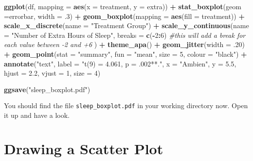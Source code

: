 \documentclass[
]{book}
\newenvironment{Shaded}{\begin{snugshade}}{\end{snugshade}}
\newcommand{\AttributeTok}[1]{\textcolor[rgb]{0.13,0.29,0.53}{#1}}
\newcommand{\CommentTok}[1]{\textcolor[rgb]{0.56,0.35,0.01}{\textit{#1}}}
\newcommand{\DecValTok}[1]{\textcolor[rgb]{0.00,0.00,0.81}{#1}}
\newcommand{\FloatTok}[1]{\textcolor[rgb]{0.00,0.00,0.81}{#1}}
\newcommand{\FunctionTok}[1]{\textcolor[rgb]{0.13,0.29,0.53}{\textbf{#1}}}
\newcommand{\NormalTok}[1]{#1}
\newcommand{\SpecialCharTok}[1]{\textcolor[rgb]{0.81,0.36,0.00}{\textbf{#1}}}
\newcommand{\StringTok}[1]{\textcolor[rgb]{0.31,0.60,0.02}{#1}}
\begin{document}
\begin{Shaded}
\begin{Highlighting}[]
\FunctionTok{ggplot}\NormalTok{(df, }\AttributeTok{mapping =} \FunctionTok{aes}\NormalTok{(}\AttributeTok{x =}\NormalTok{ treatment, }\AttributeTok{y =}\NormalTok{ extra)) }\SpecialCharTok{+} 
  \FunctionTok{stat\_boxplot}\NormalTok{(}\AttributeTok{geom =}\StringTok{\textquotesingle{}errorbar\textquotesingle{}}\NormalTok{, }\AttributeTok{width =}\NormalTok{ .}\DecValTok{3}\NormalTok{) }\SpecialCharTok{+}
  \FunctionTok{geom\_boxplot}\NormalTok{(}\AttributeTok{mapping =} \FunctionTok{aes}\NormalTok{(}\AttributeTok{fill =}\NormalTok{ treatment)) }\SpecialCharTok{+} 
  \FunctionTok{scale\_x\_discrete}\NormalTok{(}\AttributeTok{name =} \StringTok{"Treatment Group"}\NormalTok{) }\SpecialCharTok{+} 
  \FunctionTok{scale\_y\_continuous}\NormalTok{(}\AttributeTok{name =} \StringTok{"Number of Extra Hours of Sleep"}\NormalTok{, }
                     \AttributeTok{breaks =} \FunctionTok{c}\NormalTok{(}\SpecialCharTok{{-}}\DecValTok{2}\SpecialCharTok{:}\DecValTok{6}\NormalTok{) }\CommentTok{\#this will add a break for each value between {-}2 and +6}
\NormalTok{                     ) }\SpecialCharTok{+}
  \FunctionTok{theme\_apa}\NormalTok{() }\SpecialCharTok{+}
  \FunctionTok{geom\_jitter}\NormalTok{(}\AttributeTok{width =}\NormalTok{ .}\DecValTok{20}\NormalTok{) }\SpecialCharTok{+}
  \FunctionTok{geom\_point}\NormalTok{(}\AttributeTok{stat =} \StringTok{"summary"}\NormalTok{, }\AttributeTok{fun =} \StringTok{"mean"}\NormalTok{, }\AttributeTok{size =} \DecValTok{5}\NormalTok{, }\AttributeTok{colour =} \StringTok{"black"}\NormalTok{) }\SpecialCharTok{+} 
  \FunctionTok{annotate}\NormalTok{(}\StringTok{"text"}\NormalTok{,}
           \AttributeTok{label =} \StringTok{"t(9) = 4.061, p = .002**."}\NormalTok{,}
           \AttributeTok{x =} \StringTok{"Ambien"}\NormalTok{, }
           \AttributeTok{y =} \FloatTok{5.5}\NormalTok{, }
           \AttributeTok{hjust =} \FloatTok{2.2}\NormalTok{, }
           \AttributeTok{vjust =} \DecValTok{1}\NormalTok{, }
           \AttributeTok{size =} \DecValTok{4}\NormalTok{)}


\FunctionTok{ggsave}\NormalTok{(}\StringTok{"sleep\_boxplot.pdf"}\NormalTok{)}
\end{Highlighting}
\end{Shaded}

You should find the file \texttt{sleep\_boxplot.pdf} in your working directory now. Open it up and have a look.

\hypertarget{drawing-a-scatter-plot}{%
\section{Drawing a Scatter Plot}\label{drawing-a-scatter-plot}}
\end{document}
